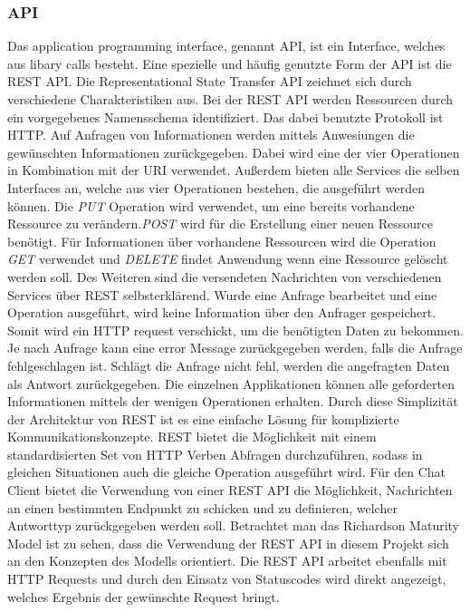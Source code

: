 \subsubsection{API}
Das application programming interface, genannt API, ist ein Interface, welches aus libary calls besteht\cite[S. 129]{steen23}.
Eine spezielle und häufig genutzte Form der API ist die REST API.
Die Representational State Transfer API zeichnet sich durch verschiedene Charakteristiken aus.
Bei der  REST API werden Ressourcen durch ein vorgegebenes Namensschema identifiziert. Das dabei benutzte Protokoll ist HTTP.
Auf Anfragen von Informationen werden mittels Anwesiungen die gewünschten Informationen zurückgegeben. Dabei wird eine der vier Operationen 
in Kombination mit der URI verwendet\cite[S. 66f]{steen23}. 
Außerdem bieten alle Services die selben Interfaces an, welche aus vier Operationen bestehen, die ausgeführt werden können. 
Die \emph{PUT} Operation wird verwendet, um eine bereits vorhandene Ressource zu verändern.\emph{POST} wird für die Erstellung einer neuen Ressource benötigt.
Für Informationen über vorhandene Ressourcen wird die Operation \emph{GET} verwendet und \emph{DELETE} findet Anwendung wenn eine Ressource gelöscht werden soll.
Des Weiteren sind die versendeten Nachrichten von verschiedenen Services über REST selbsterklärend.
Wurde eine Anfrage bearbeitet und eine Operation ausgeführt, wird keine Information über den Anfrager gespeichert. 
Somit wird ein HTTP request verschickt, um die benötigten Daten zu bekommen. 
Je nach Anfrage kann eine error Message zurückgegeben werden, falls die Anfrage fehlgeschlagen ist. 
Schlägt die Anfrage nicht fehl, werden die angefragten Daten als Antwort zurückgegeben. 
Die einzelnen Applikationen können alle geforderten Informationen mittels der wenigen Operationen erhalten\cite[S.67 ]{steen23}. 
Durch diese Simplizität der Architektur von REST ist es eine einfache Lösung für komplizierte Kommunikationskonzepte.
REST bietet die Möglichkeit mit einem standardisierten Set von HTTP Verben Abfragen durchzuführen, sodass in gleichen Situationen auch die gleiche Operation ausgeführt wird.
Für den Chat Client bietet die Verwendung von einer REST API die Möglichkeit, Nachrichten an einen bestimmten Endpunkt zu schicken und zu definieren, welcher Antworttyp zurückgegeben werden soll.
Betrachtet man das Richardson Maturity Model ist zu sehen, dass die Verwendung der REST API in diesem Projekt sich an den Konzepten des Modells orientiert\cite{richardson}. 
Die REST API arbeitet ebenfalls mit HTTP Requests und durch den Einsatz von Statuscodes wird direkt angezeigt, welches Ergebnis der gewünschte Request bringt. 
